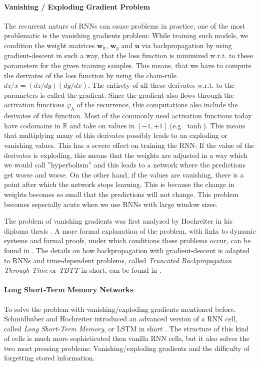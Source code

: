 \paragraph{Vanishing / Exploding Gradient Problem} The recurrent nature of RNNs can cause problems in practice, one of the most problematic is the vanishing gradients problem: While training such models, we condition the weight matrices $\mathbf{w}_h$, $\mathbf{w}_y$ and $\mathbf{u}$ via backpropagation by using gradient-descent in such a way, that the loss function is minimized w.r.t. to these parameters for the given training samples. This means, that we have to compute the derivates of the loss function by using the chain-rule $dz/x = (dz/dy)(dy/dx)$. The entirety of all these derivates w.r.t. to the parameters is called the gradient. Since the gradient also flows through the activation functions $\varphi_h$ of the recurrence, this computations also include the derivates of this function. Most of the commonly used activation functions today have codomains in $\mathbb{R}$ and take on values in $[-1, +1]$ (e.g. $\operatorname{tanh}$). This means that multiplying many of this derivates possibly leads to an exploding or vanishing values. This has a severe effect on training the RNN: If the value of the derivates is exploding, this means that the weights are adjusted in a way which we would call ''hyperbolism'' and this leads to a network where the predictions get worse and worse. On the other hand, if the values are vanishing, there is a point after which the network stops learning. This is because the change in weights becomes so small that the predictions will not change. This problem becomes especially acute when we use RNNs with large window sizes.

The problem of vanishing gradients was first analyzed by Hochreiter in his diploma thesis \cite{Hochreiter:1991}. A more formal explanation of the problem, with links to dynamic systems and formal proofs, under which conditions these problems occur, can be found in \cite{Pascanu:2013}. The details on how backpropagation with gradient-descent is adapted to RNNs and time-dependent problems, called \emph{Truncated Backpropagation Through Time} or \emph{TBTT} in short, can be found in \cite{Werbos:1990}.

\paragraph{Long Short-Term Memory Networks} To solve the problem with vanishing/exploding gradients mentioned before, Schmidhuber and Hochreiter introduced an advanced version of a RNN cell, called \emph{Long Short-Term Memory}, or LSTM in short \cite{Hochreiter:1997}. The structure of this kind of cells is much more sophisticated then vanilla RNN cells, but it also solves the two most pressing problems: Vanishing/exploding gradients and the difficulty of forgetting stored information.

